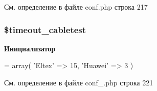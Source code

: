 См. определение в файле conf.\-php строка 217

\hypertarget{group__timeout__cabletest_ga4bf51deec9851d3432a7b41ccb07f2c8}{
\subsubsection[{\$timeout\-\_\-cabletest}]{\setlength{\rightskip}{0pt plus 5cm}\$timeout\-\_\-cabletest}}\label{group__timeout__cabletest_ga4bf51deec9851d3432a7b41ccb07f2c8}
{\bfseries Инициализатор}
\begin{DoxyCode}
= array(
    \textcolor{stringliteral}{'Eltex'} => 15,
    \textcolor{stringliteral}{'Huawei'} => 3
)
\end{DoxyCode}


См. определение в файле conf\-\_\-.\-php строка 221


